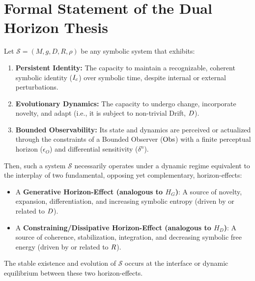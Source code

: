 \section{Formal Statement of the Dual Horizon Thesis} \label{sec:appC_formal_statement_dual_horizon_thesis}
\begin{proposition}
\label{proposition:appC_dual_horizon_necessity}
Let \(\mathcal{S} = (M, g, D, R, \rho)\) be any symbolic system that exhibits:
\begin{enumerate}[label=(\alph*)]
    \item \textbf{Persistent Identity:} The capacity to maintain a recognizable, coherent symbolic identity (\(I_c\)) over symbolic time, despite internal or external perturbations.
    \item \textbf{Evolutionary Dynamics:} The capacity to undergo change, incorporate novelty, and adapt (i.e., it is subject to non-trivial Drift, \(D\)).
    \item \textbf{Bounded Observability:} Its state and dynamics are perceived or actualized through the constraints of a Bounded Observer (\(\mathrm{Obs}\)) with a finite perceptual horizon (\(\epsilon_O\)) and differential sensitivity (\(\delta^n\)).
\end{enumerate}
Then, such a system \(\mathcal{S}\) necessarily operates under a dynamic regime equivalent to the interplay of two fundamental, opposing yet complementary, horizon-effects:
\begin{itemize}
    \item A \textbf{Generative Horizon-Effect (analogous to \(H_G\))}: A source of novelty, expansion, differentiation, and increasing symbolic entropy (driven by or related to \(D\)).
    \item A \textbf{Constraining/Dissipative Horizon-Effect (analogous to \(H_D\))}: A source of coherence, stabilization, integration, and decreasing symbolic free energy (driven by or related to \(R\)).
\end{itemize}
The stable existence and evolution of \(\mathcal{S}\) occurs at the interface or dynamic equilibrium between these two horizon-effects.
\end{proposition}
